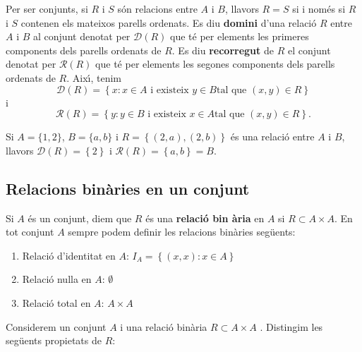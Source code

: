 Per ser conjunts, si $R$ i $S$ s\'{o}n relacions entre $A$ i $B$, llavors $%
R=S$ si i nom\'{e}s si $R$ i $S$ contenen els mateixos parells ordenats. Es
diu \textbf{domini} d'una relaci\'{o} $R$ entre $A$ i $B$ al conjunt denotat
per $\mathcal{D}\left( R\right) $ que t\'{e} per elements les primeres
components dels parells ordenats de $R$. Es diu \textbf{recorregut} de $R$
el conjunt denotat per $\mathcal{R}\left( R\right) $ que t\'{e} per elements
les segones components dels parells ordenats de $R$. Aix\'{\i}, tenim%
\begin{equation*}
\mathcal{D}\left( R\right) =\left\{ x:x\in A\text{ i existeix }y\in B\text{
tal que }(x,y)\in R\right\}
\end{equation*}
i%
\begin{equation*}
\mathcal{R}\left( R\right) =\left\{ y:y\in B\text{ i existeix }x\in A\text{
tal que }(x,y)\in R\right\} \text{.}
\end{equation*}

\begin{exem}
Si $A=\{1,2\}$, $B=\{a,b\}$ i $R=\left\{ (2,a),(2,b)\right\} $ \'{e}s una
relaci\'{o} entre $A$ i $B$, llavors $\mathcal{D}\left( R\right) =\left\{
2\right\} $ i $\mathcal{R}\left( R\right) =\left\{ a,b\right\} =B$.
\end{exem}

\subsection{Relacions bin\`{a}ries en un conjunt}

Si $A$ \'{e}s un conjunt, diem que $R$ \'{e}s una \textbf{relaci\'{o} bin%
\`{a}ria} en $A$ si $R\subset A\times A$. En tot conjunt $A$ sempre podem
definir les relacions bin\`{a}ries seg\"{u}ents:

\begin{enumerate}
\item Relaci\'{o} d'identitat en $A$: $I_{A}=\left\{ (x,x):x\in A\right\} $

\item Relaci\'{o} nul\textperiodcentered la en $A$: $\emptyset$

\item Relaci\'{o} total en $A$: $A\times A$
\end{enumerate}

\bigskip

Considerem un conjunt $A$ i una relaci\'{o} bin\`{a}ria $R\subset A\times A$%
. Distingim les seg\"{u}ents propietats de $R$:

